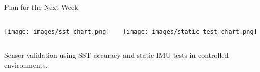 \begin{frame}{Plan for the Next Week}
    \begin{columns}[T]
        \begin{column}{0.5\textwidth}
            \centering
            \texttt{[image: images/sst\_chart.png]}
        \end{column}
        \begin{column}{0.5\textwidth}
            \centering
            \texttt{[image: images/static\_test\_chart.png]}
        \end{column}
    \end{columns}
    \vspace{1em}
    \begin{center}
        \small Sensor validation using SST accuracy and static IMU tests in controlled environments.
    \end{center}
\end{frame}